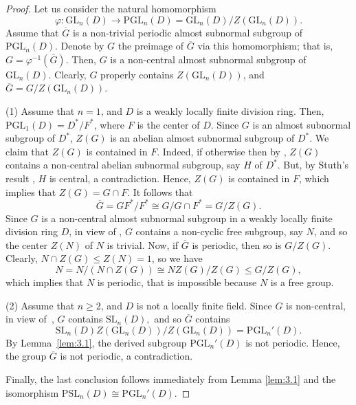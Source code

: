 \documentclass{amsart}
\theoremstyle{definition}
\begin{document}
\begin{proof} Let us consider the natural homomorphism
	$$\varphi: \mathrm{GL}_n(D)\longrightarrow \mathrm{PGL}_n(D)=\mathrm{GL}_n(D)/Z(\mathrm{GL}_n(D)).$$
	Assume that $\overline{G}$ is a non-trivial periodic almost subnormal subgroup of  $\mathrm{PGL}_n(D)$. Denote by $G$ the preimage of $\overline{G}$ via this homomorphism; that is, $G=\varphi^{-1}(\overline{G})$. Then, $G$ is a non-central  almost subnormal subgroup of $\mathrm{GL}_n(D)$. Clearly, $G$ properly contains $Z(\mathrm{GL}_n(D))$, and $\overline{G}=G/Z(\mathrm{GL}_n(D))$.
	
	(1) Assume that $n=1$, and $D$ is a weakly locally finite division ring. Then, $\mathrm{PGL}_1(D)=D^*/F^*$, where $F$ is the center of $D$. Since $G$ is an almost subnormal subgroup of $D^*$, $Z(G)$ is an abelian almost subnormal subgroup of $D^*$. We claim that $Z(G)$ is contained in $F$. Indeed, if otherwise then by \cite[Theorem 2.1]{Pa_ChNaHa_24}, $Z(G)$ contains a non-central abelian subnormal subgroup, say $H$ of $D^*$. But, by Stuth's result \cite[Theorem 1]{Pa_Stuth_1964}, $H$ is central, a contradiction. Hence,  $Z(G)$ is contained in $F$,  which implies that $Z(G)=G\cap F$. It follows that
	$$\overline{G}=GF^*/F^*\cong G/G\cap F^*=G/Z(G).$$
	Since $G$ is a non-central almost subnormal subgroup in a weakly locally finite division ring $D$, in view of \cite[Theorem 4.2]{Pa_nbh_17}, $G$ contains a non-cyclic free subgroup, say $N$, and so the center  $Z(N)$ of $N$ is trivial. Now, if $\overline{G}$ is periodic, then so is $G/Z(G)$. Clearly, $N\cap Z(G)\le Z(N)=1$, so we have
	$$N=N/(N\cap Z(G))\cong NZ(G)/Z(G)\le G/Z(G),$$ 
	which implies that $N$ is periodic, that is impossible because $N$ is a free group. 
	
	(2) Assume that $n\ge 2$, and $D$ is not a locally finite field. Since $G$ is non-central, in view of~\cite[Theorem~3.3]{Pa_nbh_17}, $G$ contains $\mathrm{SL}_n(D),$ and so $\overline{G}$ contains $$\mathrm{SL}_n(D)Z(\mathrm{GL}_n(D))/Z(\mathrm{GL}_n(D))=\mathrm{PGL}_n'(D).$$ By Lemma~\ref{lem:3.1}, the derived subgroup $\mathrm{PGL}_n'(D)$ is not periodic. Hence, the group $\overline{G}$ is not periodic, a contradiction. 
	
	Finally, the last conclusion follows immediately from Lemma \ref{lem:3.1} and the isomorphism $\mathrm{PSL}_n(D)\cong \mathrm{PGL}_n'(D)$.
\end{proof}
\end{document}
